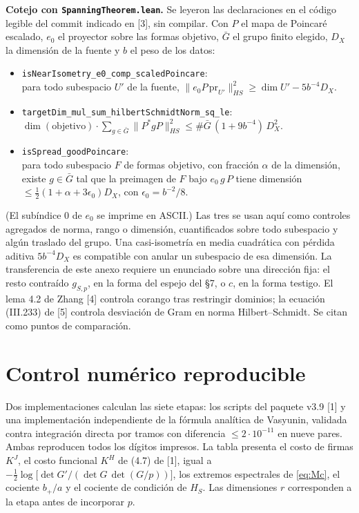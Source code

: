 \documentclass[11pt,a4paper]{article}
\theoremstyle{plain}
\begin{document}
\textbf{Cotejo con \texttt{SpanningTheorem.lean}.} Se leyeron las declaraciones en el código legible del commit indicado en [3], sin compilar. Con $P$ el mapa de Poincaré escalado, $e_0$ el proyector sobre las formas objetivo, $\bar G$ el grupo finito elegido, $D_X$ la dimensión de la fuente y $b$ el peso de los datos:
\begin{itemize}[leftmargin=1.5em,itemsep=2pt]
\item \texttt{isNearIsometry\_\allowbreak{}e0\_\allowbreak{}comp\_\allowbreak{}scaledPoincare}:\\ para todo subespacio $U'$ de la fuente, $\|e_0P\,\mathrm{pr}_{U'}\|_{HS}^2\ge\dim U'-5b^{-4}D_X$.
\item \texttt{targetDim\_\allowbreak{}mul\_\allowbreak{}sum\_\allowbreak{}hilbertSchmidtNorm\_\allowbreak{}sq\_\allowbreak{}le}:\\ $\dim(\text{objetivo})\cdot\sum_{g\in\bar G}\|P^*gP\|_{HS}^2\le\#\bar G\,(1+9b^{-4})\,D_X^2$.
\item \texttt{isSpread\_\allowbreak{}goodPoincare}:\\ para todo subespacio $F$ de formas objetivo, con fracción $\alpha$ de la dimensión, existe $g\in\bar G$ tal que la preimagen de $F$ bajo $e_0\,g\,P$ tiene dimensión $\le\frac12(1+\alpha+3\epsilon_0)D_X$, con $\epsilon_0=b^{-2}/8$.
\end{itemize}
(El subíndice 0 de $e_0$ se imprime en ASCII.) Las tres se usan aquí como controles agregados de norma, rango o dimensión, cuantificados sobre todo subespacio y algún traslado del grupo. Una casi-isometría en media cuadrática con pérdida aditiva $5b^{-4}D_X$ es compatible con anular un subespacio de esa dimensión. La transferencia de este anexo requiere un enunciado sobre una dirección fija: el resto contraído $g_{S,p}$, en la forma del espejo del §7, o $c$, en la forma testigo. El lema 4.2 de Zhang [4] controla corango tras restringir dominios; la ecuación (III.233) de [5] controla desviación de Gram en norma Hilbert–Schmidt. Se citan como puntos de comparación.

\section{Control numérico reproducible}

Dos implementaciones calculan las siete etapas: los scripts del paquete v3.9 [1] y una implementación independiente de la fórmula analítica de Vasyunin, validada contra integración directa por tramos con diferencia $\le2\cdot10^{-11}$ en nueve pares. Ambas reproducen todos los dígitos impresos. La tabla presenta el costo de firmas $K^J$, el costo funcional $K^H$ de (4.7) de [1], igual a $-\frac12\log\bigl[\det G'/(\det G\,\det(G/p))\bigr]$, los extremos espectrales de \eqref{eq:Mc}, el cociente $b_+/a$ y el cociente de condición de $H_S$. Las dimensiones $r$ corresponden a la etapa antes de incorporar $p$.
\end{document}
